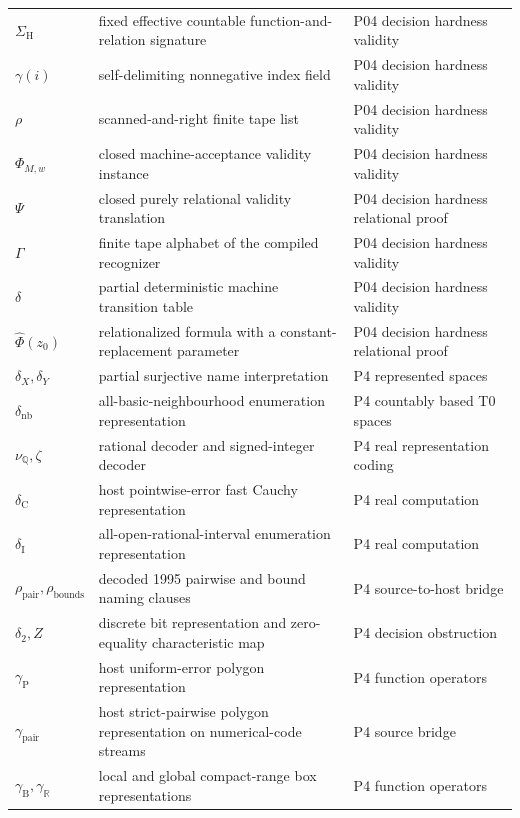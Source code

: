 \begin{longtable}{@{}p{}p{}p{}@{}}
\(\Sigma_{\mathrm H}\) & fixed effective countable function-and-relation signature & P04 decision hardness validity \\
\(\gamma(i)\) & self-delimiting nonnegative index field & P04 decision hardness validity \\
\(\rho\) & scanned-and-right finite tape list & P04 decision hardness validity \\
\(\Phi_{M,w}\) & closed machine-acceptance validity instance & P04 decision hardness validity \\
\(\Psi\) & closed purely relational validity translation & P04 decision hardness relational proof \\
\(\Gamma\) & finite tape alphabet of the compiled recognizer & P04 decision hardness validity \\
\(\delta\) & partial deterministic machine transition table & P04 decision hardness validity \\
\(\widehat\Phi(z_0)\) & relationalized formula with a constant-replacement parameter & P04 decision hardness relational proof \\
\(\delta_X,\allowbreak \delta_Y\) & partial surjective name interpretation & P4 represented spaces \\
\(\delta_{\mathrm{nb}}\) & all-basic-neighbourhood enumeration representation & P4 countably based T0 spaces \\
\(\nu_{\mathbb Q},\allowbreak \zeta\) & rational decoder and signed-integer decoder & P4 real representation coding \\
\(\delta_{\mathrm C}\) & host pointwise-error fast Cauchy representation & P4 real computation \\
\(\delta_{\mathrm I}\) & all-open-rational-interval enumeration representation & P4 real computation \\
\(\rho_{\mathrm{pair}},\allowbreak \rho_{\mathrm{bounds}}\) & decoded 1995 pairwise and bound naming clauses & P4 source-\allowbreak{}to-\allowbreak{}host bridge \\
\(\delta_2,\allowbreak Z\) & discrete bit representation and zero-equality characteristic map & P4 decision obstruction \\
\(\gamma_{\mathrm P}\) & host uniform-error polygon representation & P4 function operators \\
\(\gamma_{\mathrm{pair}}\) & host strict-pairwise polygon representation on numerical-code streams & P4 source bridge \\
\(\gamma_{\mathrm B},\allowbreak \gamma_{\mathbb R}\) & local and global compact-range box representations & P4 function operators \\

\end{longtable}
